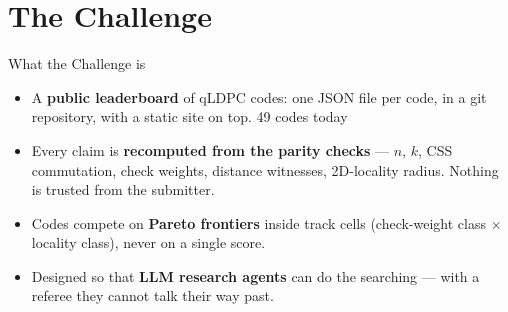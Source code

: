 \documentclass[11pt,aspectratio=169]{beamer}
\begin{document}
\section{The Challenge}

\begin{frame}{What the Challenge is}
  \begin{itemize}\setlength{\itemsep}{8pt}
    \item A \textbf{public leaderboard} of qLDPC codes: one JSON file per code,
          in a git repository, with a static site on top.
          \hfill {\color{muted}\small 49 codes today}
    \item Every claim is \textbf{recomputed from the parity checks} --- $n$, $k$,
          CSS commutation, check weights, distance witnesses, 2D-locality radius.
          Nothing is trusted from the submitter.
    \item Codes compete on \textbf{Pareto frontiers} inside track cells
          (check-weight class $\times$ locality class), never on a single score.
    \item Designed so that \textbf{LLM research agents} can do the searching ---
          with a referee they cannot talk their way past.
  \end{itemize}
\end{frame}
\end{document}
